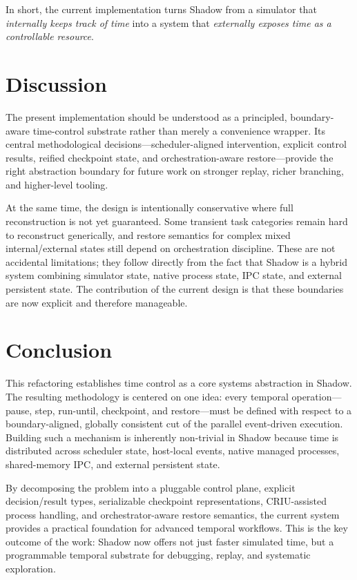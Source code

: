 \documentclass[11pt,a4paper]{article}
\begin{document}
In short, the current implementation turns Shadow from a simulator that
\emph{internally keeps track of time} into a system that \emph{externally
exposes time as a controllable resource}.

\section{Discussion}

The present implementation should be understood as a principled, boundary-aware
time-control substrate rather than merely a convenience wrapper. Its central
methodological decisions---scheduler-aligned intervention, explicit control
results, reified checkpoint state, and orchestration-aware restore---provide
the right abstraction boundary for future work on stronger replay, richer
branching, and higher-level tooling.

At the same time, the design is intentionally conservative where full
reconstruction is not yet guaranteed. Some transient task categories remain
hard to reconstruct generically, and restore semantics for complex mixed
internal/external states still depend on orchestration discipline. These are
not accidental limitations; they follow directly from the fact that Shadow is
a hybrid system combining simulator state, native process state, IPC state,
and external persistent state. The contribution of the current design is that
these boundaries are now explicit and therefore manageable.

\section{Conclusion}

This refactoring establishes time control as a core systems abstraction in
Shadow. The resulting methodology is centered on one idea: every temporal
operation---pause, step, run-until, checkpoint, and restore---must be defined
with respect to a boundary-aligned, globally consistent cut of the parallel
event-driven execution. Building such a mechanism is inherently non-trivial in
Shadow because time is distributed across scheduler state, host-local events,
native managed processes, shared-memory IPC, and external persistent state.

By decomposing the problem into a pluggable control plane, explicit
decision/result types, serializable checkpoint representations, CRIU-assisted
process handling, and orchestrator-aware restore semantics, the current system
provides a practical foundation for advanced temporal workflows. This is the
key outcome of the work: Shadow now offers not just faster simulated time, but
a programmable temporal substrate for debugging, replay, and systematic
exploration.
\end{document}
